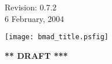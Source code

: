 \thispagestyle{empty}

\begin{flushright}
\large
  Revision: 0.7.2 \\
  6 February, 2004 \\
\end{flushright}

\vfill

{
\begin{center}
\texttt{[image: bmad\_title.psfig]} \\
\end{center}
}

\vskip 1in
\begin{center}
{\Huge \bf *** DRAFT ***}
\end{center}
\vfill
\break